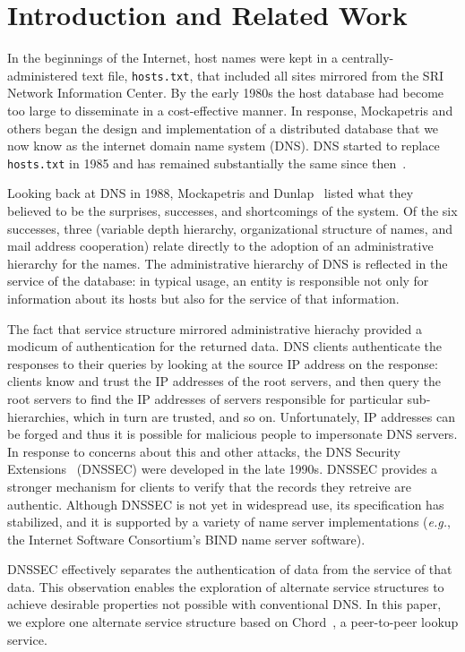 \section{Introduction and Related Work}

In the beginnings of the Internet, host names were kept
in a centrally-administered text file, {\tt hosts.txt}, that
included all sites mirrored from the SRI Network Information Center.
By the early 1980s the host database had become too large
to disseminate in a cost-effective manner.
In response, Mockapetris and others began the design and
implementation of a distributed database that we now know
as the internet domain name system (DNS).
DNS started to replace {\tt hosts.txt} in 1985 and has remained
substantially the same since then~\cite{dns-concept:rfc, dns}.

Looking back at DNS in 1988, Mockapetris and Dunlap~\cite{dns}
listed what they believed to be the surprises, successes,
and shortcomings of the system.  Of the six successes,
three (variable depth hierarchy, organizational structure
of names, and mail address cooperation) relate directly 
to the adoption of an administrative hierarchy for the names.
The administrative hierarchy of DNS is reflected in the 
service of the database: in typical usage, an
entity is responsible not only for information about its hosts
but also for the service of that information.

The fact that service structure mirrored administrative hierachy
provided a modicum of authentication for the returned data.
DNS clients authenticate the responses to their queries by
looking at the source IP address on the response:
clients know and trust the IP addresses of the root servers, and then
query the root servers to find the IP addresses of servers
responsible for particular sub-hierarchies, which in turn are
trusted, and so on.
Unfortunately, IP addresses can be forged and thus it is possible
for malicious people to impersonate DNS servers.
In response to concerns about this and
other attacks, the DNS Security Extensions~\cite{dnssec:rfc}
(DNSSEC) were developed in the late 1990s.
DNSSEC provides a stronger mechanism for clients to verify that the
records they retreive are authentic.
Although DNSSEC is not yet in widespread use, its specification
has stabilized, and it is supported by a variety of name server
implementations ({\em e.g.}, the Internet Software Consortium's
BIND name server software).

DNSSEC effectively separates the authentication of data from the
service of that data.  This observation enables the exploration of alternate service 
structures to achieve desirable properties not possible
with conventional DNS.  In this paper, we explore one
alternate service structure based on Chord~\cite{chord:sigcomm},
a peer-to-peer lookup service.

